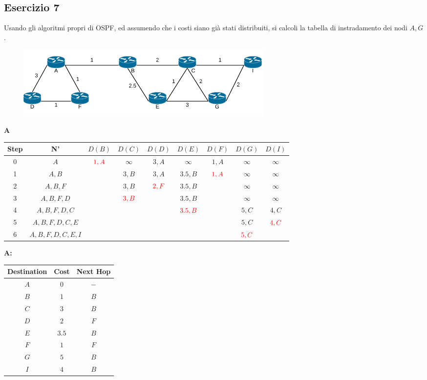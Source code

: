 \documentclass[10pt]{article}
\begin{document}
	\subsection{Esercizio 7}
	Usando gli algoritmi propri di OSPF, ed assumendo che i costi siano già stati distribuiti, si calcoli la tabella di instradamento dei nodi ${A,G}$.
	\begin{figure}[h]
	\centering
	\includegraphics[width=13cm]{es7}
	\end{figure}
	\begin{center}
	\textbf{A}
 		\begin{tabular}{||c c c c c c c c c||} 
 			\hline
 			Step & N' & $D(B)$ & $D(C)$ & $D(D)$ & $D(E)$ & $D(F)$ & $D(G)$ & $D(I)$ \\
 			\hline\hline
 			0 & $A$ & $\color{red} 1,A$ & $\infty$ & $3,A$ & $\infty$ & $1,A$ & $\infty$ & $\infty$ \\
 			\hline
 			1 & $A,B$ & & $3,B$ & $3,A$ & $3.5,B$ & $\color{red} 1,A$ & $\infty$ & $\infty$ \\
 			\hline
			2 & $A,B,F$ & & $3,B$ & $\color{red} 2,F$ & $3.5,B$ & & $\infty$ & $\infty$ \\
			\hline
			3 & $A,B,F,D$ & & $\color{red} 3,B$ & & $3.5,B$ & & $\infty$ & $\infty$ \\ 
 			\hline
			4 & $A,B,F,D,C$ & & & & $\color{red} 3.5,B$ & & $5,C$ & $4,C$ \\
			\hline
			5 & $A,B,F,D,C,E$ & & & & & & $5,C$ & $\color{red} 4,C$ \\
			\hline
			6 & $A,B,F,D,C,E,I$ & & & & & & $\color{red} 5,C$ & \\[0.5ex]
 			\hline
		\end{tabular}
	\end{center}
	\begin{center}
	\textbf{A:}
		\begin{tabular}{||c || c || c||}
			\hline
 			Destination & Cost & Next Hop\\ [0.5ex] 
 			\hline\hline
			$A$ & $0$ & $-$\\
			$B$ & $1$ & $B$\\
 			$C$ & $3$ & $B$\\
			$D$ & $2$ & $F$\\
			$E$ & $3.5$ & $B$\\
			$F$ & $1$ & $F$\\
			$G$ & $5$ & $B$\\
			$I$ & $4$ & $B$\\[0.5ex] 
			\hline
		\end{tabular}
	\end{center}	
	
\end{document}

